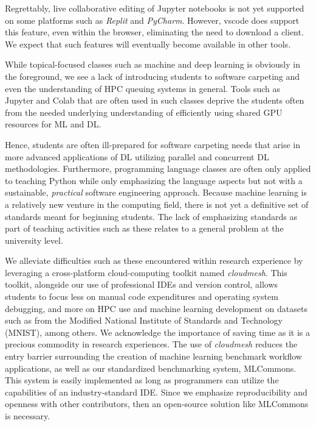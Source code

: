 \documentclass[utf8]{FrontiersinVancouver} %
\begin{document}
Regrettably, live collaborative editing of Jupyter notebooks is not yet supported on some platforms such as {\em Replit} and {\em PyCharm}. However, vscode does support this feature, even within the browser, eliminating the need to download a client. We expect that such features will eventually become available in other tools. 

While topical-focused classes such as machine and deep learning is obviously in the foreground, we 
see a lack of introducing students to software carpeting and even the understanding of HPC queuing systems in general. Tools such as Jupyter and Colab that are often used in such classes deprive the students often from the needed underlying understanding of efficiently using shared GPU resources for ML and DL. 

Hence, students are often ill-prepared for software carpeting needs that arise in more advanced applications of DL utilizing parallel and concurrent DL methodologies. Furthermore, programming language classes are often only applied to teaching Python while only emphasizing the language aspects but not with a sustainable, {\em practical} software engineering approach. Because machine learning is a relatively new venture in the computing field, there is not yet a definitive set of standards meant for beginning students. 
The lack of emphasizing standards as part of teaching activities such as these relates to a general problem at the university level. 


We alleviate difficulties such as these encountered within research experience by leveraging a cross-platform cloud-computing toolkit named {\em cloudmesh}. This toolkit, alongside our use of professional IDEs and version control, allows students to focus less on manual code expenditures and operating system debugging, and more on HPC use and machine learning development on datasets such as from the Modified National Institute of Standards and Technology (MNIST), among others. We acknowledge the importance of saving time as it is a precious commodity in research experiences.  
The use of {\em cloudmesh} reduces the entry barrier surrounding the creation of machine learning benchmark workflow applications, as well as our standardized benchmarking system, MLCommons. This system is easily implemented as long as programmers can utilize the capabilities of an industry-standard IDE. Since we emphasize reproducibility and openness with other contributors, then an open-source solution like MLCommons is necessary.
\end{document}
